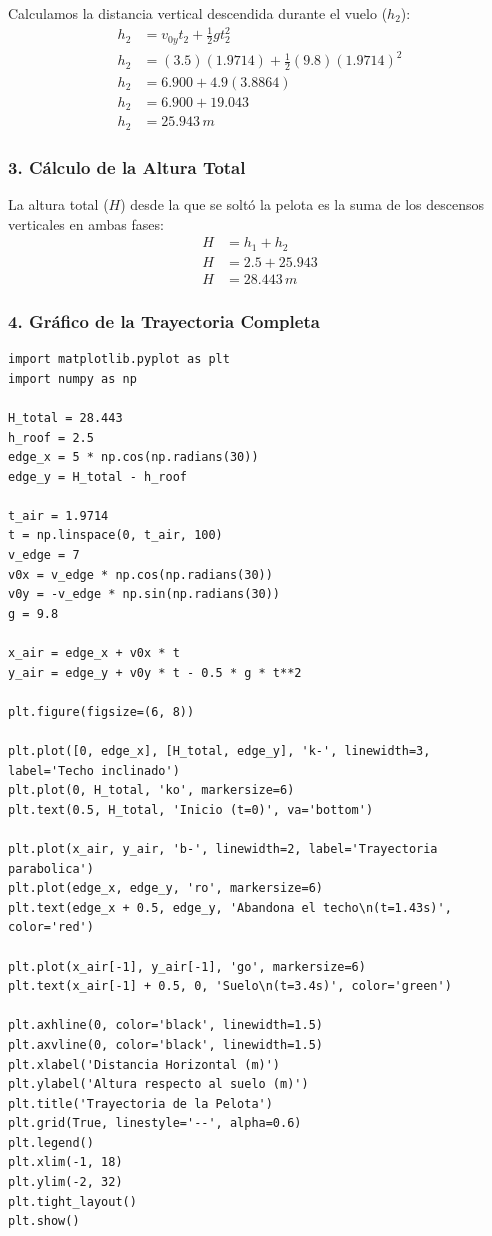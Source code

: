 \documentclass[12pt, a4paper]{article}
\begin{document}
Calculamos la distancia vertical descendida durante el vuelo ($h_2$):
\begin{align*}
h_2 &= v_{0y} t_2 + \frac{1}{2} g t_2^2 \\
h_2 &= (3.5)(1.9714) + \frac{1}{2}(9.8)(1.9714)^2 \\
h_2 &= 6.900 + 4.9(3.8864) \\
h_2 &= 6.900 + 19.043 \\
h_2 &= 25.943 \, \si{m}
\end{align*}

\subsubsection*{3. Cálculo de la Altura Total}
La altura total ($H$) desde la que se soltó la pelota es la suma de los descensos verticales en ambas fases:
\begin{align*}
H &= h_1 + h_2 \\
H &= 2.5 + 25.943 \\
H &= 28.443 \, \si{m}
\end{align*}

\subsubsection*{4. Gráfico de la Trayectoria Completa}
\begin{verbatim}
import matplotlib.pyplot as plt
import numpy as np

H_total = 28.443
h_roof = 2.5
edge_x = 5 * np.cos(np.radians(30))
edge_y = H_total - h_roof

t_air = 1.9714
t = np.linspace(0, t_air, 100)
v_edge = 7
v0x = v_edge * np.cos(np.radians(30))
v0y = -v_edge * np.sin(np.radians(30))
g = 9.8

x_air = edge_x + v0x * t
y_air = edge_y + v0y * t - 0.5 * g * t**2

plt.figure(figsize=(6, 8))

plt.plot([0, edge_x], [H_total, edge_y], 'k-', linewidth=3, label='Techo inclinado')
plt.plot(0, H_total, 'ko', markersize=6)
plt.text(0.5, H_total, 'Inicio (t=0)', va='bottom')

plt.plot(x_air, y_air, 'b-', linewidth=2, label='Trayectoria parabolica')
plt.plot(edge_x, edge_y, 'ro', markersize=6)
plt.text(edge_x + 0.5, edge_y, 'Abandona el techo\n(t=1.43s)', color='red')

plt.plot(x_air[-1], y_air[-1], 'go', markersize=6)
plt.text(x_air[-1] + 0.5, 0, 'Suelo\n(t=3.4s)', color='green')

plt.axhline(0, color='black', linewidth=1.5)
plt.axvline(0, color='black', linewidth=1.5)
plt.xlabel('Distancia Horizontal (m)')
plt.ylabel('Altura respecto al suelo (m)')
plt.title('Trayectoria de la Pelota')
plt.grid(True, linestyle='--', alpha=0.6)
plt.legend()
plt.xlim(-1, 18)
plt.ylim(-2, 32)
plt.tight_layout()
plt.show()
\end{verbatim}
\end{document}
